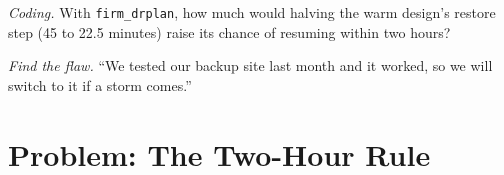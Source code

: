 \begin{exercise}[$\star\star\star$]\label{exo:nw:disaster-recovery-and-regulatory-requirements:7}
\emph{Coding.} With \texttt{firm\_drplan}, how much would halving the warm design's restore step (45 to 22.5 minutes) raise its chance of
resuming within two hours?
\end{exercise}

\begin{exercise}[$\star\star\star$]\label{exo:nw:disaster-recovery-and-regulatory-requirements:8}
\emph{Find the flaw.} ``We tested our backup site last month and it worked, so we will switch to it if a storm comes.''
\end{exercise}

\section{Problem: The Two-Hour Rule}

